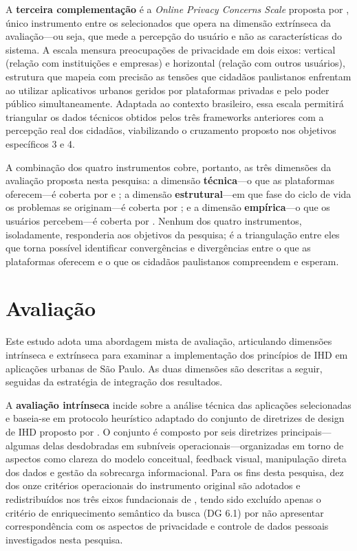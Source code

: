 \documentclass[
	12pt,				%
	oneside,			%
	a4paper,			%
	english,			%
	brazil				%
	]{abntex2ppgsi}
\begin{document}
    A \textbf{terceira complementação} é a \textit{Online Privacy Concerns Scale} proposta por , único instrumento entre os selecionados que opera na dimensão extrínseca da avaliação---ou seja, que mede a percepção do usuário e não as características do sistema. A escala mensura preocupações de privacidade em dois eixos: vertical (relação com instituições e empresas) e horizontal (relação com outros usuários), estrutura que mapeia com precisão as tensões que cidadãos paulistanos enfrentam ao utilizar aplicativos urbanos geridos por plataformas privadas e pelo poder público simultaneamente. Adaptada ao contexto brasileiro, essa escala permitirá triangular os dados técnicos obtidos pelos três frameworks anteriores com a percepção real dos cidadãos, viabilizando o cruzamento proposto nos objetivos específicos 3 e 4.
    
    A combinação dos quatro instrumentos cobre, portanto, as três dimensões da avaliação proposta nesta pesquisa: a dimensão \textbf{técnica}---o que as plataformas oferecem---é coberta por  e ; a dimensão \textbf{estrutural}---em que fase do ciclo de vida os problemas se originam---é coberta por ; e a dimensão \textbf{empírica}---o que os usuários percebem---é coberta por . Nenhum dos quatro instrumentos, isoladamente, responderia aos objetivos da pesquisa; é a triangulação entre eles que torna possível identificar convergências e divergências entre o que as plataformas oferecem e o que os cidadãos paulistanos compreendem e esperam.
    
    \section{Avaliação}\label{avalia}

    Este estudo adota uma abordagem mista de avaliação, articulando dimensões intrínseca e extrínseca para examinar a implementação dos princípios de IHD em aplicações urbanas de São Paulo. As duas dimensões são descritas a seguir, seguidas da estratégia de integração dos resultados.

    A \textbf{avaliação intrínseca} incide sobre a análise técnica das aplicações selecionadas e baseia-se em protocolo heurístico adaptado do conjunto de diretrizes de design de IHD proposto por . O conjunto é composto por seis diretrizes principais---algumas delas desdobradas em subníveis operacionais---organizadas em torno de aspectos como clareza do modelo conceitual, feedback visual, manipulação direta dos dados e gestão da sobrecarga informacional. Para os fins desta pesquisa, dez dos onze critérios operacionais do instrumento original são adotados e redistribuídos nos três eixos fundacionais de , tendo sido excluído apenas o critério de enriquecimento semântico da busca (DG 6.1) por não apresentar correspondência com os aspectos de privacidade e controle de dados pessoais investigados nesta pesquisa.
\end{document}
